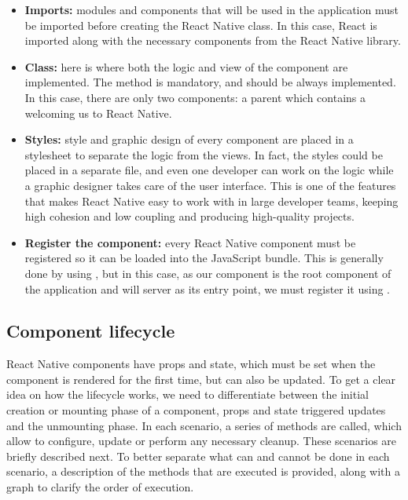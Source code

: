 \begin{itemize}
 \item \textbf{Imports:} modules and components that will be used in the application must be imported before creating the React Native class. In this case, React is imported along with the necessary components from the React Native library.
 \item \textbf{Class:} here is where both the logic and view of the component are implemented. The  method is mandatory, and should be always implemented. In this case, there are only two components: a parent  which contains a  welcoming us to React Native.
 \item \textbf{Styles:} style and graphic design of every component are placed in a stylesheet to separate the logic from the views. In fact, the styles could be placed in a separate file, and even one developer can work on the logic while a graphic designer takes care of the user interface. This is one of the features that makes React Native easy to work with in large developer teams, keeping high cohesion and low coupling and producing high-quality projects.
 \item \textbf{Register the component:} every React Native component must be registered so it can be loaded into the JavaScript bundle. This is generally done by using , but in this case, as our component is the root component of the application and will server as its entry point, we must register it using .
\end{itemize}

\subsection{Component lifecycle}

React Native components have props and state, which must be set when the component is rendered for the first time, but can also be updated. To get a clear idea on how the lifecycle works, we need to differentiate between the initial creation or mounting phase of a component, props and state triggered updates and the unmounting phase. In each scenario, a series of methods are called, which allow to configure, update or perform any necessary cleanup. These scenarios are briefly described next. To better separate what can and cannot be done in each scenario, a description of the methods that are executed is provided, along with a graph to clarify the order of execution.

